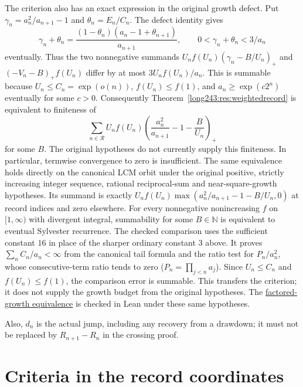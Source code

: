 \documentclass[11pt]{article}
\begin{document}
The criterion also has an exact expression in the original growth defect.
Put $\gamma_n=a_n^2/a_{n+1}-1$ and $\theta_n=E_n/C_n$. The defect identity
gives
\[
 \gamma_n+\theta_n=
 \frac{(1-\theta_n)(a_n-1+\theta_{n+1})}{a_{n+1}},
 \qquad 0<\gamma_n+\theta_n<3/a_n
\]
eventually. Thus the two nonnegative summands
$U_nf(U_n)(\gamma_n-B/U_n)_+$ and $(-V_n-B)_+f(U_n)$ differ by at most
$3U_nf(U_n)/a_n$. This is summable because
$U_n\le C_n=\exp(o(n))$, $f(U_n)\le f(1)$, and
$a_n\ge\exp(c2^n)$ eventually for some $c>0$.
Consequently Theorem~\ref{long243:res:weightedrecord} is equivalent to finiteness of
\begin{equation}\label{long243:eq:weightedgrowth}
 \sum_{n\in\mathcal R}U_nf(U_n)
 \left(\frac{a_n^2}{a_{n+1}}-1-\frac B{U_n}\right)_+
\end{equation}
for some $B$. The original hypotheses do not currently supply this
finiteness. In particular, termwise convergence to zero is insufficient.
The same equivalence holds directly on the canonical LCM orbit under the
original positive, strictly increasing integer sequence, rational reciprocal-sum
and near-square-growth hypotheses.  Its summand is exactly
$U_nf(U_n)\max(a_n^2/a_{n+1}-1-B/U_n,0)$ at record indices and zero elsewhere.
For every nonnegative nonincreasing $f$ on $[1,\infty)$
with divergent integral, summability for some $B\in\mathbb N$ is equivalent to eventual Sylvester
recurrence.  The checked comparison uses the sufficient constant $16$ in
place of the sharper ordinary constant $3$ above.  It proves
$\sum_n C_n/a_n<\infty$ from the canonical tail formula and the ratio test
for $P_n/a_n^2$, whose consecutive-term ratio tends to zero
($P_n=\prod_{j<n}a_j$).  Since $U_n\le C_n$ and $f(U_n)\le f(1)$,
the comparison error is summable.  This transfers the criterion; it does
not supply the growth budget from the original hypotheses.
The \href{https://github.com/wcook04/plectis-erdos/blob/d4fed71423840f70f10edf27b9ad27c22fc4f49a/ErdosProblems/Erdos243/PaperCompleteR8/GrowthDebtSummability.lean#L234}{factored-growth equivalence}
is checked in Lean under these same hypotheses.

Also, $d_n$ is the actual jump, including any recovery from a drawdown; it
must not be replaced by $R_{n+1}-R_n$ in the crossing proof.


\section{Criteria in the record coordinates}\label{long243:sec:records}
\end{document}
